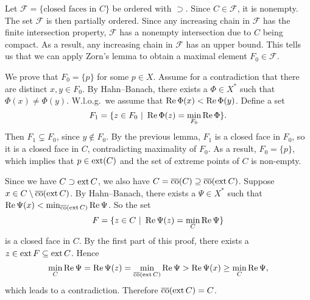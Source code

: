 \begin{myproof}
  Let $\mathcal{F} = \{\textrm{closed faces in $C$}\}$ be ordered with $\supset$.
  Since $C \in \mathcal{F}$, it is nonempty. The set $\mathcal{F}$ is then partially ordered. Since any 
  increasing chain in $\mathcal{F}$ has the finite intersection property, $\mathcal{F}$ has a nonempty intersection due to $C$ being compact.
  As a result, any increasing chain in $\mathcal{F}$ has an upper bound.
  This tells us that we can apply Zorn's lemma to obtain a maximal element $F_0 \in \mathcal{F}$.
  
  \vspace*{0.5\baselineskip}
  We prove that $F_0 = \{p\}$ for some $p \in X$. Assume for a contradiction that there are distinct $x, y \in F_0$.
  By Hahn--Banach, there exists a $\Phi \in X^*$ such that $\Phi(x) \neq \Phi(y)$.
  W.l.o.g.~we assume that $\operatorname{Re} \Phi(x) < \operatorname{Re} \Phi(y)$. Define a set 
  $$F_1 = \{z \in F_0\ |\ \operatorname{Re} \Phi(z) = \min_{F_0} \operatorname{Re} \Phi\}.$$
  Then $F_1 \subsetneq F_0$, since $y \notin F_0$. By the previous lemma,
  $F_1$ is a closed face in $F_0$, so it is a closed face in $C$, contradicting maximality of $F_0$.
  As a result, $F_0 = \{p\}$, which implies that $p \in \operatorname{ext} (C)$ and the set of extreme points of $C$ is non-empty.
  
  \vspace*{0.5\baselineskip}
  Since we have $C \supset \operatorname{ext} C$, we also have $C = \overline{\operatorname{co}} (C) \supseteq \overline{\operatorname{co}} (\operatorname{ext} C)$.
  Suppose $x \in C \setminus \overline{\operatorname{co}} (\operatorname{ext} C)$. By Hahn--Banach, there exists a $\Psi \in X^*$
  such that $\operatorname{Re} \Psi(x) < \min _{\overline{\operatorname{co}} (\operatorname{ext} C)} \operatorname{Re} \Psi$.
  So the set 
  $$F = \{z \in C\ |\ \operatorname{Re} \Psi (z) = \min_C \operatorname{Re} \Psi\}$$
  is a closed face in $C$. By the first part of this proof,
  there exists a $z \in \operatorname{ext} F \subseteq \operatorname{ext} C$. Hence 
  $$\min_C \operatorname{Re} \Psi = \operatorname{Re} \Psi (z) = \min_{\overline{\operatorname{co}} (\operatorname{ext} C)} \operatorname{Re} \Psi > \operatorname{Re} \Psi(x) \geq \min_C \operatorname{Re} \Psi,$$
  which leads to a contradiction. Therefore $\overline{\operatorname{co}} (\operatorname{ext} C) = C$.
\end{myproof}


